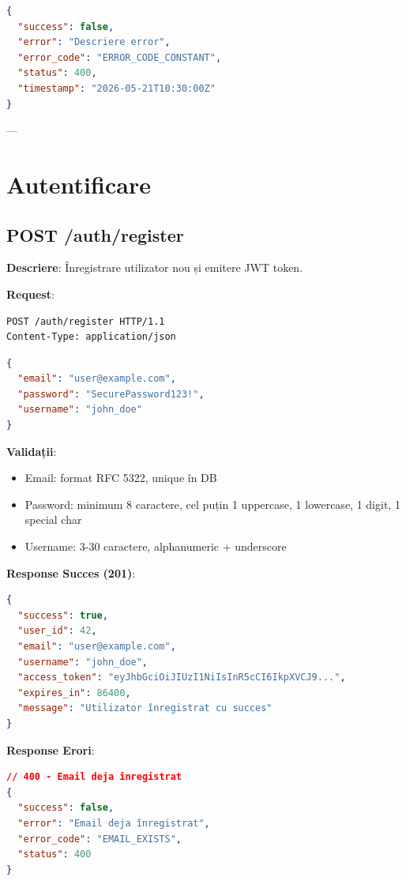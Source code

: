 \begin{lstlisting}[language=JSON]
{
  "success": false,
  "error": "Descriere error",
  "error_code": "ERROR_CODE_CONSTANT",
  "status": 400,
  "timestamp": "2026-05-21T10:30:00Z"
}
\end{lstlisting}

---

\section{Autentificare}

\subsection{POST /auth/register}

\textbf{Descriere}: Înregistrare utilizator nou și emitere JWT token.

\textbf{Request}:

\begin{lstlisting}[language=HTTP]
POST /auth/register HTTP/1.1
Content-Type: application/json
\end{lstlisting}

\begin{lstlisting}[language=JSON]
{
  "email": "user@example.com",
  "password": "SecurePassword123!",
  "username": "john_doe"
}
\end{lstlisting}

\textbf{Validații}:
\begin{itemize}
    \item Email: format RFC 5322, unique în DB
    \item Password: minimum 8 caractere, cel puțin 1 uppercase, 1 lowercase, 1 digit, 1 special char
    \item Username: 3-30 caractere, alphanumeric + underscore
\end{itemize}

\textbf{Response Succes (201)}:

\begin{lstlisting}[language=JSON]
{
  "success": true,
  "user_id": 42,
  "email": "user@example.com",
  "username": "john_doe",
  "access_token": "eyJhbGciOiJIUzI1NiIsInR5cCI6IkpXVCJ9...",
  "expires_in": 86400,
  "message": "Utilizator înregistrat cu succes"
}
\end{lstlisting}

\textbf{Response Erori}:

\begin{lstlisting}[language=JSON]
// 400 - Email deja înregistrat
{
  "success": false,
  "error": "Email deja înregistrat",
  "error_code": "EMAIL_EXISTS",
  "status": 400
}
\end{lstlisting}

